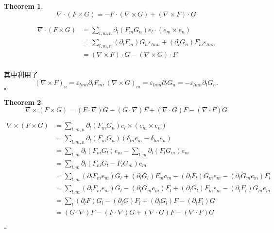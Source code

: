 \documentclass[11pt,hyperref,a4paper,UTF8]{ctexart}
\newtheorem{theorem}{Theorem}[subsection]
\newenvironment{cproof}{%
\heiti{证明}\kaishu
}{%
  \hfill $\square$
  \par\bigskip
}
\begin{document}
\begin{CJK}{UTF8}{gkai}
\begin{theorem}
  \[\nabla \cdot (F \times G) = - F \cdot (\nabla \times G) + (\nabla \times F) \cdot G\]
\end{theorem}
\begin{cproof}
  \[\begin{aligned}
    \nabla \cdot (F \times G) &= \sum_{l,m,n} \partial_l(F_m G_n) e_l \cdot (e_m \times e_n)\\
    &= \sum_{l,m,n}  (\partial_l F_m) G_n \varepsilon_{lmn} + (\partial_l G_n) F_m\varepsilon_{lmn}\\
    &= (\nabla \times F) \cdot G - (\nabla \times G) \cdot F\\
  \end{aligned}\]

  其中利用了
  \[(\nabla \times F)_n=\varepsilon_{lmn}\partial_{l}F_{m}, (\nabla \times G)_m =\varepsilon_{lnm} \partial_{l}G_{n}= -\varepsilon_{lmn}\partial_{l}G_{n}.\]
\end{cproof}  

\begin{theorem}
  \[\nabla \times (F \times G) = (F \cdot \nabla) G - (G \cdot \nabla) F + (\nabla \cdot G) F - (\nabla \cdot F)G\]
\end{theorem}

\begin{cproof}
  \[\begin{aligned}
    \nabla \times (F \times G) &= \sum_{l,m,n}\partial_l (F_m G_n) e_l \times (e_m \times e_n)\\
    &= \sum_{l,m,n} \partial_l (F_m G_n) (\delta_{ln} e_m - \delta_{lm} e_n)\\
    &= \sum_{l,m}\partial_l(F_m G_l) e_m - \sum_{l,m}\partial_l(F_l G_m) e_m\\
    &= \sum_{l,m} \partial_l(F_m G_l - F_l G_m)e_m\\
    &= \sum_{l,m}(\partial_l F_m e_m)G_l + (\partial_l G_l)F_m e_m - (\partial_l F_l) G_m e_m - (\partial_l G_m e_m)F_l\\
    &= \sum_{l,m} (\partial_l F_m e_m)G_l - (\partial_l G_m e_m) F_l + (\partial_l G_l)F_m e_m - (\partial_l F_l)G_m e_m\\
    &= \sum_{l} (\partial_l F)G_l - (\partial_l G)F_l + (\partial_l G_l) F - (\partial_l F_l)G\\
    &= (G\cdot \nabla) F - (F\cdot \nabla)G + (\nabla \cdot G) F -(\nabla \cdot F)G\\
  \end{aligned}\]

\end{cproof}



\end{CJK}
\end{document}
